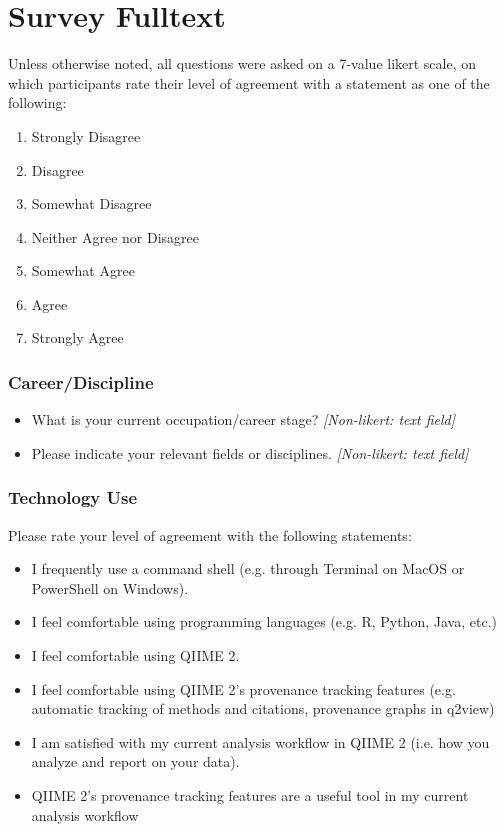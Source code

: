 \chapter{Survey Fulltext}
\label{app:survey}

\noindent Unless otherwise noted, all questions were asked on a 7-value likert
scale, on which participants rate their level of agreement with a statement as
one of the following:
\begin{enumerate}
    \item Strongly Disagree
    \item Disagree
    \item Somewhat Disagree
    \item Neither Agree nor Disagree
    \item Somewhat Agree
    \item Agree
    \item Strongly Agree
\end{enumerate}

\hline

\subsection*{Career/Discipline}

\begin{itemize}
    \item What is your current occupation/career stage? \emph{[Non-likert: text field]}
    \item Please indicate your relevant fields or disciplines. \emph{[Non-likert: text field]}
\end{itemize}

\subsection*{Technology Use}

\noindent Please rate your level of agreement with the following statements:

\begin{itemize}
    \item I frequently use a command shell (e.g. through Terminal on MacOS or PowerShell on Windows).
    \item I feel comfortable using programming languages (e.g. R, Python, Java, etc.)
    \item I feel comfortable using QIIME 2.
    \item I feel comfortable using QIIME 2's provenance tracking features (e.g. automatic tracking of methods and citations, provenance graphs in q2view)
    \item I am satisfied with my current analysis workflow in QIIME 2 (i.e. how you analyze and report on your data).
    \item QIIME 2’s provenance tracking features are a useful tool in my current analysis workflow
\end{itemize}

